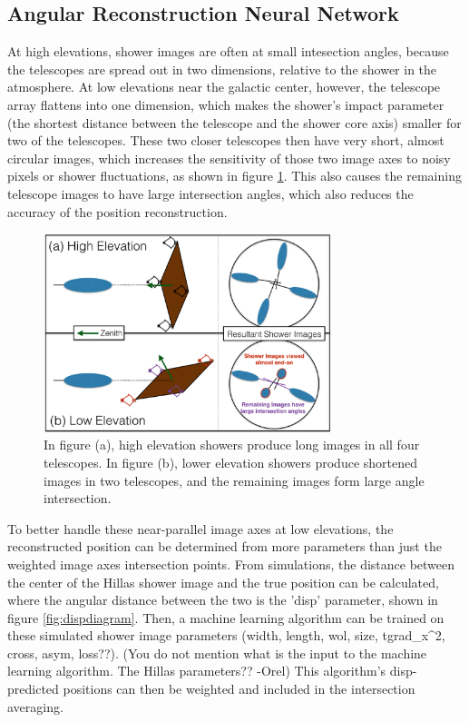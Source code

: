 \subsection{Angular Reconstruction Neural Network}\label{subsec:disp}
At high elevations, shower images are often at small intesection angles, because the telescopes are spread out in two dimensions, relative to the shower in the atmosphere.
At low elevations near the galactic center, however, the telescope array flattens into one dimension, which makes the shower's impact parameter (the shortest distance between the telescope and the shower core axis) smaller for two of the telescopes.
These two closer telescopes then have very short, almost circular images, which increases the sensitivity of those two image axes to noisy pixels or shower fluctuations, as shown in figure \ref{fig:showerhighlowelev}.
This also causes the remaining telescope images to have large intersection angles, which also reduces the accuracy of the position reconstruction.

\begin{figure}[ht]
  \begin{center}
    \includegraphics[width=0.75\textwidth]{images/high_elevation_vs_low_shower_images_cropped.eps}
    \caption[Shower Images at High and Low Elevations]{In figure (a), high elevation showers produce long images in all four telescopes.  In figure (b), lower elevation showers produce shortened images in two telescopes, and the remaining images form large angle intersection.}\label{fig:showerhighlowelev}
  \end{center}
\end{figure}


To better handle these near-parallel image axes at low elevations, the reconstructed position can be determined from more parameters than just the weighted image axes intersection points.
From simulations, the distance between the center of the Hillas shower image and the true position can be calculated, where the angular distance between the two is the 'disp' parameter\cite{Senturk:2011}, shown in figure \ref{fig:dispdiagram}.
Then, a machine learning algorithm \cite{Beilicke2012NIM} can be trained on these simulated shower image parameters (width, length, wol, size, tgrad_x^2, cross, asym, loss??). %
(You do not mention what is the input to the machine learning algorithm. The Hillas parameters?? -Orel)
This algorithm's disp-predicted positions can then be weighted and included in the intersection averaging.

